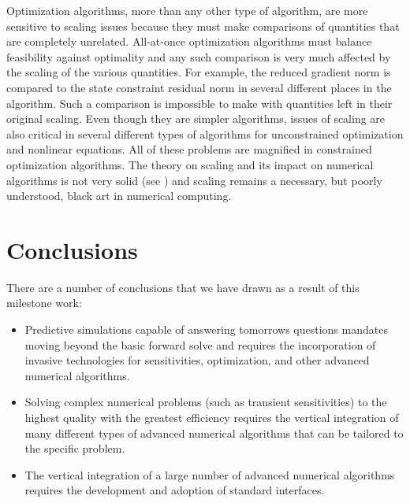 \documentclass[pdf,ps2pdf,11pt]{SANDreport}
\begin{document}
{Optimization algorithms, more than any other type of algorithm, are more
sensitive to scaling issues because they must make comparisons of quantities
that are completely unrelated.  All-at-once optimization algorithms must
balance feasibility against optimality and any such comparison is very much
affected by the scaling of the various quantities.  For example, the reduced
gradient norm is compared to the state constraint residual norm in several
different places in the algorithm.  Such a comparison is impossible to make
with quantities left in their original scaling.  Even though they are simpler
algorithms, issues of scaling are also critical in several different types of
algorithms for unconstrained optimization and nonlinear equations.  All of
these problems are magnified in constrained optimization algorithms.  The
theory on scaling and its impact on numerical algorithms is not very solid
(see {}\cite{ref:dennis_schnabel_1996}) and scaling remains a necessary, but
poorly understood, black art in numerical computing.



%
\section{Conclusions}
%

There are a number of conclusions that we have drawn as a result of this
milestone work:

\begin{itemize}

{}\item Predictive simulations capable of answering tomorrows questions
mandates moving beyond the basic forward solve and requires the incorporation
of invasive technologies for sensitivities, optimization, and other advanced
numerical algorithms.

{}\item Solving complex numerical problems (such as transient sensitivities)
to the highest quality with the greatest efficiency requires the vertical
integration of many different types of advanced numerical algorithms that can
be tailored to the specific problem.

{}\item The vertical integration of a large number of advanced numerical
algorithms requires the development and adoption of standard interfaces.


\end{itemize}}
\end{document}
